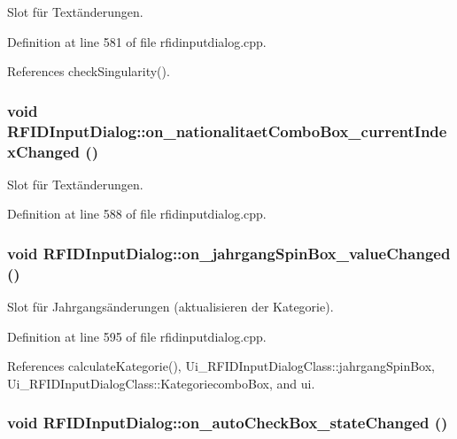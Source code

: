 Slot für Textänderungen. 



Definition at line 581 of file rfidinputdialog.cpp.

References checkSingularity().\hypertarget{class_r_f_i_d_input_dialog_34a7d69970ebded23245a780906fd893}{
\subsubsection[on\_\-nationalitaetComboBox\_\-currentIndexChanged]{\setlength{\rightskip}{0pt plus 5cm}void RFIDInputDialog::on\_\-nationalitaetComboBox\_\-currentIndexChanged ()}}
\label{class_r_f_i_d_input_dialog_34a7d69970ebded23245a780906fd893}


Slot für Textänderungen. 



Definition at line 588 of file rfidinputdialog.cpp.\hypertarget{class_r_f_i_d_input_dialog_814026b0c5b8a24cb6a97e1eefd0284a}{
\subsubsection[on\_\-jahrgangSpinBox\_\-valueChanged]{\setlength{\rightskip}{0pt plus 5cm}void RFIDInputDialog::on\_\-jahrgangSpinBox\_\-valueChanged ()}}
\label{class_r_f_i_d_input_dialog_814026b0c5b8a24cb6a97e1eefd0284a}


Slot für Jahrgangsänderungen (aktualisieren der Kategorie). 



Definition at line 595 of file rfidinputdialog.cpp.

References calculateKategorie(), Ui\_\-RFIDInputDialogClass::jahrgangSpinBox, Ui\_\-RFIDInputDialogClass::KategoriecomboBox, and ui.\hypertarget{class_r_f_i_d_input_dialog_46a201754a6bffc77cb0bdcd3f696a48}{
\subsubsection[on\_\-autoCheckBox\_\-stateChanged]{\setlength{\rightskip}{0pt plus 5cm}void RFIDInputDialog::on\_\-autoCheckBox\_\-stateChanged ()}}
\label{class_r_f_i_d_input_dialog_46a201754a6bffc77cb0bdcd3f696a48}


